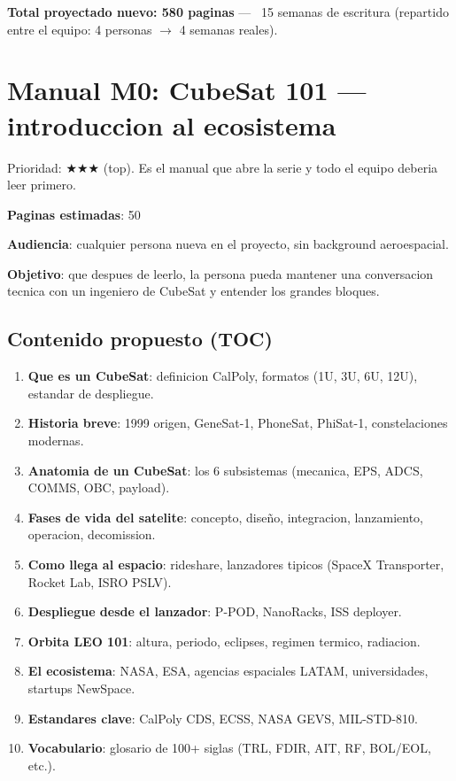\documentclass[11pt,a4paper,oneside]{report}
\begin{document}
\textbf{Total proyectado nuevo: 580 paginas} --- ~15 semanas de escritura
(repartido entre el equipo: 4 personas $\to$ 4 semanas reales).

\chapter{Manual M0: CubeSat 101 --- introduccion al ecosistema}

\begin{prioritario}
Prioridad: $\bigstar\bigstar\bigstar$ (top). Es el manual que abre la
serie y todo el equipo deberia leer primero.
\end{prioritario}

\textbf{Paginas estimadas}: 50

\textbf{Audiencia}: cualquier persona nueva en el proyecto, sin background
aeroespacial.

\textbf{Objetivo}: que despues de leerlo, la persona pueda mantener una
conversacion tecnica con un ingeniero de CubeSat y entender los grandes
bloques.

\section{Contenido propuesto (TOC)}

\begin{enumerate}[leftmargin=2em]
  \item \textbf{Que es un CubeSat}: definicion CalPoly, formatos (1U, 3U, 6U, 12U),
        estandar de despliegue.
  \item \textbf{Historia breve}: 1999 origen, GeneSat-1, PhoneSat, PhiSat-1,
        constelaciones modernas.
  \item \textbf{Anatomia de un CubeSat}: los 6 subsistemas (mecanica, EPS,
        ADCS, COMMS, OBC, payload).
  \item \textbf{Fases de vida del satelite}: concepto, diseño, integracion,
        lanzamiento, operacion, decomission.
  \item \textbf{Como llega al espacio}: rideshare, lanzadores tipicos (SpaceX
        Transporter, Rocket Lab, ISRO PSLV).
  \item \textbf{Despliegue desde el lanzador}: P-POD, NanoRacks, ISS deployer.
  \item \textbf{Orbita LEO 101}: altura, periodo, eclipses, regimen termico,
        radiacion.
  \item \textbf{El ecosistema}: NASA, ESA, agencias espaciales LATAM,
        universidades, startups NewSpace.
  \item \textbf{Estandares clave}: CalPoly CDS, ECSS, NASA GEVS,
        MIL-STD-810.
  \item \textbf{Vocabulario}: glosario de 100+ siglas (TRL, FDIR, AIT, RF,
        BOL/EOL, etc.).
\end{enumerate}
\end{document}
